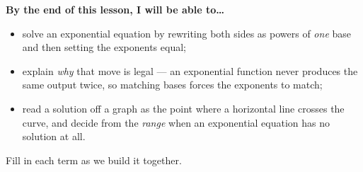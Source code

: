\documentclass[10pt]{article}
\begin{document}
\namedateperiod

\vspace{0.08in}

\begin{objectivebox}
\textbf{By the end of this lesson, I will be able to\dots}
\begin{itemize}\setlength{\itemsep}{2pt}
  \item solve an exponential equation by rewriting both sides as powers of \emph{one} base and then setting the exponents equal;
  \item explain \emph{why} that move is legal --- an exponential function never produces the same output twice, so matching bases forces the exponents to match;
  \item read a solution off a graph as the point where a horizontal line crosses the curve, and decide from the \emph{range} when an exponential equation has no solution at all.
\end{itemize}
\end{objectivebox}

\vspace{0.05in}

\begin{vocabbox}
\small
Fill in each term as we build it together.
\par\vspace{2pt}   %
\end{vocabbox}
\end{document}
